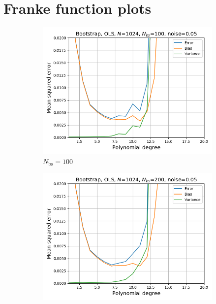 \documentclass[a4paper]{article}
\begin{document}

\section{Franke function plots} \label{app:Frankeplots}
\begin{figure}[H]
  \centering
  \begin{subfigure}{0.49\textwidth}
    \includegraphics[scale=0.45]{../figures/task_b/bias_variance_N1024_pmax20_nlamb1_noise0.05_seed4155_OLS_boot_Nbs100.png}
    \caption{$N_{\text{bs}} = 100$}
  \end{subfigure}
  \begin{subfigure}{0.49\textwidth}
    \includegraphics[scale=0.45]{../figures/task_b/bias_variance_N1024_pmax20_nlamb1_noise0.05_seed4155_OLS_boot_Nbs200.png}

\end{subfigure}
\end{figure}
\end{document}
